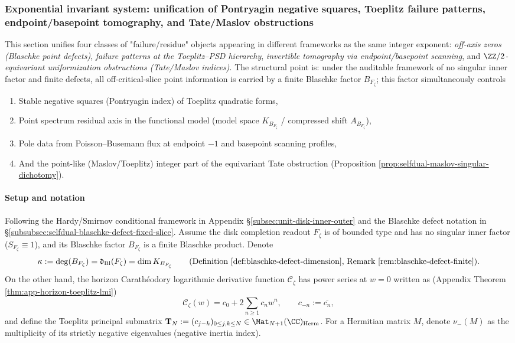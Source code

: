 \subsubsection{Exponential invariant system: unification of Pontryagin negative squares, Toeplitz failure patterns, endpoint/basepoint tomography, and Tate/Maslov obstructions}\label{subsubsec:xi-pontryagin-toeplitz-blaschke-tomography-tate}
This section unifies four classes of "failure/residue" objects appearing in different frameworks as the same integer exponent:
\emph{off-axis zeros (Blaschke point defects)}, \emph{failure patterns at the Toeplitz--PSD hierarchy}, \emph{invertible tomography via endpoint/basepoint scanning}, and \emph{\(\ZZ/2\)-equivariant uniformization obstructions (Tate/Maslov indices)}.
The structural point is: under the auditable framework of no singular inner factor and finite defects, all off-critical-slice point information is carried by a finite Blaschke factor \(B_{F_{\zeta}}\); this factor simultaneously controls
\begin{enumerate}
  \item Stable negative squares (Pontryagin index) of Toeplitz quadratic forms,
  \item Point spectrum residual axis in the functional model (model space \(K_{B_{F_\zeta}}\) / compressed shift \(A_{B_{F_\zeta}}\)),
  \item Pole data from Poisson--Busemann flux at endpoint \(-1\) and basepoint scanning profiles,
  \item And the point-like (Maslov/Toeplitz) integer part of the equivariant Tate obstruction (Proposition \ref{prop:selfdual-maslov-singular-dichotomy}).
\end{enumerate}

\paragraph{Setup and notation}
Following the Hardy/Smirnov conditional framework in Appendix \S\ref{subsec:unit-disk-inner-outer} and the Blaschke defect notation in \S\ref{subsubsec:selfdual-blaschke-defect-fixed-slice}.
Assume the disk completion readout \(F_{\zeta}\) is of bounded type and has no singular inner factor (\(S_{F_{\zeta}}\equiv 1\)), and its Blaschke factor \(B_{F_{\zeta}}\) is a finite Blaschke product.
Denote
\[
\kappa:=\deg(B_{F_{\zeta}})=\mathfrak d_{\mathrm{Bl}}(F_{\zeta})=\dim K_{B_{F_{\zeta}}}
\qquad\text{(Definition \ref{def:blaschke-defect-dimension}, Remark \ref{rem:blaschke-defect-finite})}.
\]
On the other hand, the horizon Carathéodory logarithmic derivative function \(\mathscr{C}_{\zeta}\) has power series at \(w=0\) written as (Appendix Theorem \ref{thm:app-horizon-toeplitz-lmi})
\[
\mathscr{C}_{\zeta}(w)=c_0+2\sum_{n\ge 1}c_n w^n,
\qquad c_{-n}:=\overline{c_n},
\]
and define the Toeplitz principal submatrix
\(
\mathbf{T}_N:=(c_{j-k})_{0\le j,k\le N}\in\Mat_{N+1}(\CC)_{\mathrm{Herm}}
\).
For a Hermitian matrix \(M\), denote \(\nu_-(M)\) as the multiplicity of its strictly negative eigenvalues (negative inertia index).

